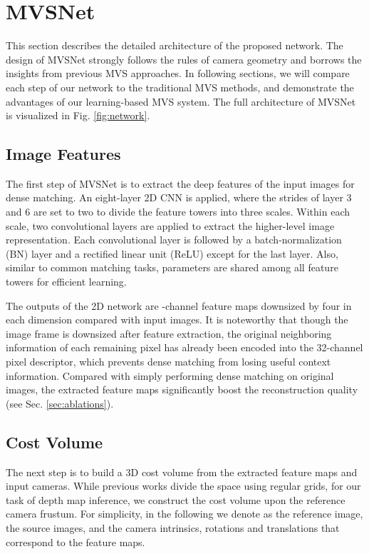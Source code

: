 \documentclass[runningheads]{llncs}
\begin{document}
\section{MVSNet}

This section describes the detailed architecture of the proposed network. The design of MVSNet strongly follows the rules of camera geometry and borrows the insights from previous MVS approaches. In following sections, we will compare each step of our network to the traditional MVS methods, and demonstrate the advantages of our learning-based MVS system. The full architecture of MVSNet is visualized in Fig. \ref{fig:network}.





\subsection{Image Features}

The first step of MVSNet is to extract the deep features  of the  input images  for dense matching. An eight-layer 2D CNN is applied, where the strides of layer 3 and 6 are set to two to divide the feature towers into three scales. Within each scale, two convolutional layers are applied to extract the higher-level image representation. Each convolutional layer is followed by a batch-normalization (BN) layer and a rectified linear unit (ReLU) except for the last layer. Also, similar to common matching tasks, parameters are shared among all feature towers for efficient learning. 
	
The outputs of the 2D network are  -channel feature maps downsized by four in each dimension compared with input images. It is noteworthy that though the image frame is downsized after feature extraction, the original neighboring information of each remaining pixel has already been encoded into the 32-channel pixel descriptor, which prevents dense matching from losing useful context information. Compared with simply performing dense matching on original images, the extracted feature maps significantly boost the reconstruction quality (see Sec. \ref{sec:ablations}).

\subsection{Cost Volume}


The next step is to build a 3D cost volume from the extracted feature maps and input cameras. While previous works \cite{ji2017surfacenet,kar2017learning} divide the space using regular grids, for our task of depth map inference, we construct the cost volume upon the reference camera frustum. For simplicity, in the following we denote  as the reference image,  the source images, and  the camera intrinsics, rotations and translations that correspond to the feature maps.
\end{document}
